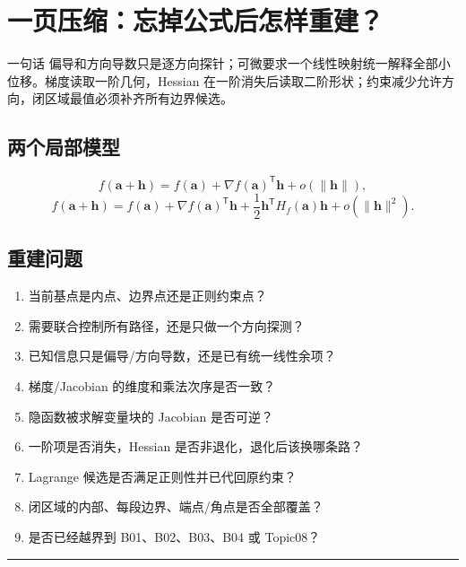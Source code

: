 \documentclass[11pt,a4paper,fontset=fandol]{ctexart}
\begin{document}
\section{一页压缩：忘掉公式后怎样重建？}
\begin{corebox}{一句话}
偏导和方向导数只是逐方向探针；可微要求一个线性映射统一解释全部小位移。梯度读取一阶几何，Hessian 在一阶消失后读取二阶形状；约束减少允许方向，闭区域最值必须补齐所有边界候选。
\end{corebox}

\subsection{两个局部模型}
\[
f(\mathbf a+\mathbf h)=f(\mathbf a)+{\nabla f(\mathbf a)}^{\mathsf T}\mathbf h+o(\lVert\mathbf h\rVert),
\]
\[
f(\mathbf a+\mathbf h)=f(\mathbf a)+{\nabla f(\mathbf a)}^{\mathsf T}\mathbf h
+\frac12\mathbf h^{\mathsf T}H_f(\mathbf a)\mathbf h+o(\lVert\mathbf h\rVert^2).
\]

\subsection{重建问题}
\begin{enumerate}
  \item 当前基点是内点、边界点还是正则约束点？
  \item 需要联合控制所有路径，还是只做一个方向探测？
  \item 已知信息只是偏导/方向导数，还是已有统一线性余项？
  \item 梯度/Jacobian 的维度和乘法次序是否一致？
  \item 隐函数被求解变量块的 Jacobian 是否可逆？
  \item 一阶项是否消失，Hessian 是否非退化，退化后该换哪条路？
  \item Lagrange 候选是否满足正则性并已代回原约束？
  \item 闭区域的内部、每段边界、端点/角点是否全部覆盖？
  \item 是否已经越界到 B01、B02、B03、B04 或 Topic08？
\end{enumerate}

\begin{center}\rule{0.5\linewidth}{0.5pt}\end{center}
\appendix
\end{document}
